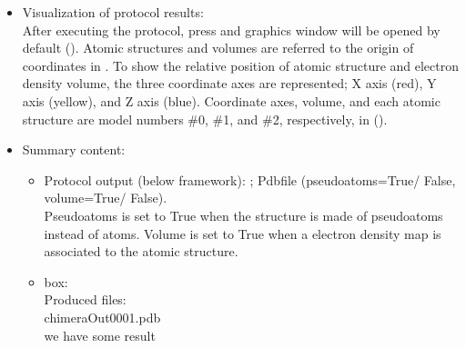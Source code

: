 \begin{itemize}
  \item Visualization of protocol results:\\
  
    After executing the protocol, press  and \chimera graphics window will be opened by default (). Atomic structures and volumes are referred to the origin of coordinates in \chimera. To show the relative position of atomic structure and electron density volume, the three coordinate axes are represented; X axis (red), Y axis (yellow), and Z axis (blue). Coordinate axes, volume, and each atomic structure are model numbers \#0, \#1, and \#2, respectively, in \chimera {} ().\\
   
  \item Summary content:\\
  
   \begin{itemize}
     \item Protocol output (below \scipion framework): ; Pdbfile (pseudoatoms=True/ False, volume=True/ False).\\Pseudoatoms is set to True when the structure is made of pseudoatoms instead of atoms. Volume is set to True when a electron density map is associated to the atomic structure.\\
     \item {} box:\\Produced files:\\chimeraOut0001.pdb\\we have some result\\
    \end{itemize}
  
 \end{itemize}


